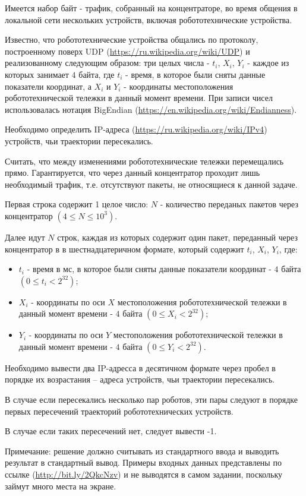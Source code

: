 
Имеется набор байт - трафик, собранный на концентраторе, во время общения в локальной сети нескольких устройств, включая робототехнические устройства.

Известно, что робототехнические устройства общались по протоколу, построенному поверх UDP (\url{https://ru.wikipedia.org/wiki/UDP}) 
и реализованному следующим образом: три целых числа - $t_i$, $X_i$, $Y_i$ - каждое из которых занимает $4$ байта, 
где $t_i$ - время, в которое были сняты данные показатели координат, а $X_i$ и $Y_i$ - 
координаты местоположения робототехнической тележки в данный момент времени. При записи чисел использовалась нотация BigEndian 
(\url{https://en.wikipedia.org/wiki/Endianness}).

Необходимо определить IP-адреса (\url{https://ru.wikipedia.org/wiki/IPv4}) устройств, чьи траектории пересекались.

Считать, что между изменениями робототехнические тележки перемещались прямо. Гарантируется, что через данный концентратор проходит лишь необходимый трафик, т.е. отсутствуют пакеты, не относящиеся к данной задаче.

 
Первая строка содержит 1 целое число: $N$ - количество переданых пакетов через концентратор  $(4 \leq N \leq 10^3)$.

Далее идут $N$ строк, каждая из которых содержит один пакет, переданный через концентратор в 
в шестнадцатеричном формате, который содержит $t_i$, $X_i$, $Y_i$, где:

\begin{itemize}
    \item $t_i$ - время в мс, в которое были сняты данные показатели координат - 
    $4$ байта $(0 \leq t_i < 2^{32})$;
    \item $X_i$ - координаты по оси $X$ местоположения робототехнической тележки в данный момент времени - $4$ байта $(0 \leq X_i < 2^{32})$;
    \item $Y_i$ - координаты по оси $Y$ местоположения робототехнической тележки в данный момент времени - $4$ байта $(0 \leq Y_i < 2^{32})$.
\end{itemize}

\outputfmtSection

Необходимо вывести два IP-адресса в десятичном формате через пробел в порядке их возрастания -- адреса устройств,
чьи траектории пересекались.

В случае если пересекались несколько пар роботов,  эти пары следуют в порядке первых пересечений траекторий
робототехнических устройств.

В случае если таких пересечений нет, следует вывести -1. 

Примечание: решение должно считывать из стандартного ввода и выводить результат в стандартный вывод. 
Примеры входных данных представлены по ссылке (\url{http://bit.ly/2QkcNzv}) и не выводятся в самом задании, поскольку займут много места на экране.

